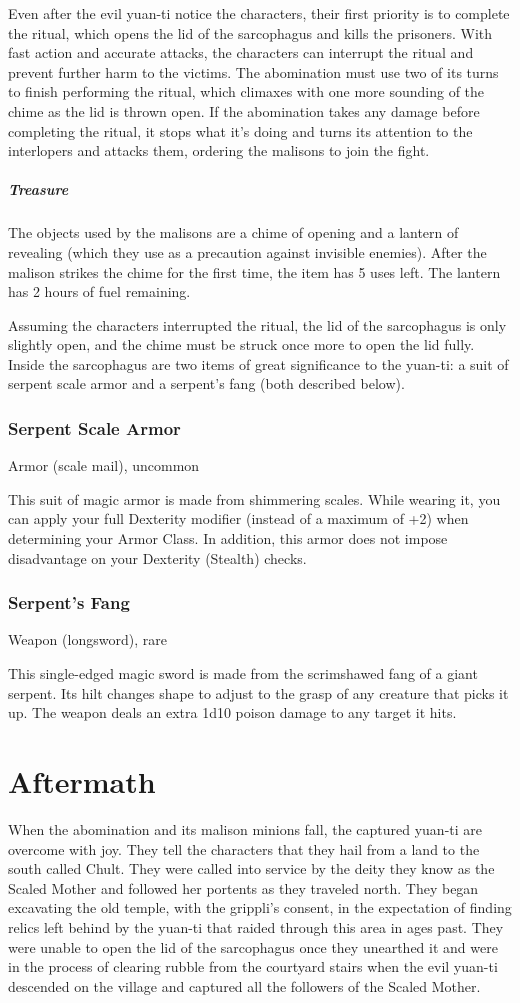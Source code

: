 \documentclass[10pt,a4paper,twoside,bg=print,twocolumn,openany,nodeprecatedcode]{dndbook}
\begin{document}
Even after the evil yuan-ti notice the characters, their first priority is to complete the ritual, which opens the lid of the sarcophagus and kills the prisoners. With fast action and accurate attacks, the characters can interrupt the ritual and prevent further harm to the victims. The abomination must use two of its turns to finish performing the ritual, which climaxes with one more sounding of the chime as the lid is thrown open. If the abomination takes any damage before completing the ritual, it stops what it's doing and turns its attention to the interlopers and attacks them, ordering the malisons to join the fight.

\subparagraph{Treasure}
The objects used by the malisons are a chime of opening and a lantern of revealing (which they use as a precaution against invisible enemies). After the malison strikes the chime for the first time, the item has 5 uses left. The lantern has 2 hours of fuel remaining.

Assuming the characters interrupted the ritual, the lid of the sarcophagus is only slightly open, and the chime must be struck once more to open the lid fully. Inside the sarcophagus are two items of great significance to the yuan-ti: a suit of serpent scale armor and a serpent's fang (both described below).

\subsubsection{Serpent Scale Armor}
Armor (scale mail), uncommon

This suit of magic armor is made from shimmering scales. While wearing it, you can apply your full Dexterity modifier (instead of a maximum of +2) when determining your Armor Class. In addition, this armor does not impose disadvantage on your Dexterity (Stealth) checks.

\subsubsection{Serpent's Fang}
Weapon (longsword), rare

This single-edged magic sword is made from the scrimshawed fang of a giant serpent. Its hilt changes shape to adjust to the grasp of any creature that picks it up. The weapon deals an extra 1d10 poison damage to any target it hits.

\section{Aftermath}
When the abomination and its malison minions fall, the captured yuan-ti are overcome with joy. They tell the characters that they hail from a land to the south called Chult. They were called into service by the deity they know as the Scaled Mother and followed her portents as they traveled north. They began excavating the old temple, with the grippli's consent, in the expectation of finding relics left behind by the yuan-ti that raided through this area in ages past. They were unable to open the lid of the sarcophagus once they unearthed it and were in the process of clearing rubble from the courtyard stairs when the evil yuan-ti descended on the village and captured all the followers of the Scaled Mother.
\end{document}
